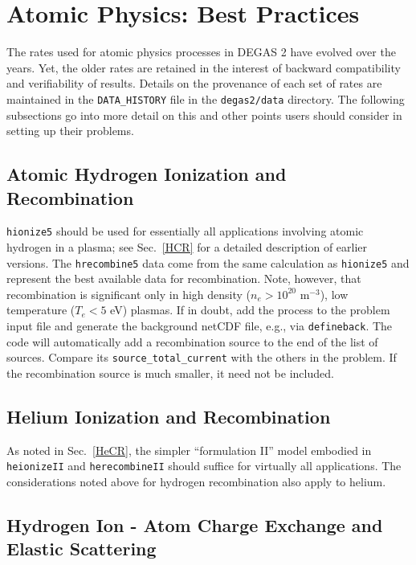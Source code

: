 \documentclass[12pt]{report}
\begin{document}
\section{Atomic Physics: Best Practices}
\label{bestpractices}

The rates used for atomic physics processes in DEGAS 2 have evolved over
the years.  Yet, the older rates are retained in the interest of
backward compatibility and verifiability of results.  Details on
the provenance of each set of rates are maintained in the
{\tt DATA\_HISTORY} file in the {\tt degas2/data} directory. 
The following subsections go into more detail on this and
other points users should consider
in setting up their problems.

\subsection{Atomic Hydrogen Ionization and Recombination}

{\tt hionize5} should be used for essentially all applications involving 
atomic hydrogen in a plasma; see Sec.~\ref{HCR} for a detailed description
of earlier versions.  The {\tt hrecombine5} data come
from the same calculation as {\tt hionize5} and represent the best available
data for recombination.  Note, however, that recombination is significant
only in high density ($n_{e} > 10^{20}$ m$^{-3}$), low temperature ($T_{e} < 5$ eV)
plasmas.  If in doubt, add the process to the problem input file and 
generate the background netCDF file, e.g., via {\tt defineback}.
The code will automatically add a recombination source to the
end of the list of sources.
Compare its {\tt source\_total\_current} 
with the others in the problem.  If the recombination source is much
smaller, it need not be included.

\subsection{Helium Ionization and Recombination}

As noted in Sec.~\ref{HeCR}, the simpler ``formulation II'' model
embodied in {\tt heionizeII} and {\tt herecombineII} should suffice for virtually all
applications.  The considerations noted above for hydrogen recombination
also apply to helium. 

\subsection{Hydrogen Ion - Atom Charge Exchange and Elastic Scattering}
\end{document}
